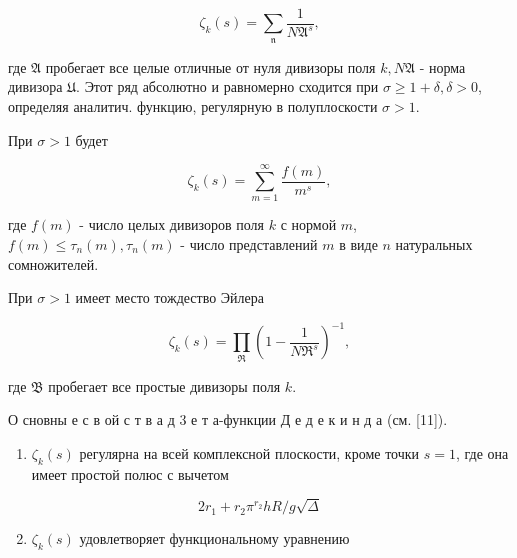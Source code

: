 \documentclass[10pt]{article}
\begin{document}
\[

\zeta_{k}(s)=\sum_{\mathfrak{n}} \frac{1}{N \mathfrak{A}^{s}},

\]



где $\mathfrak{A}$ пробегает все целые отличные от нуля дивизоры поля $k, N \mathfrak{A}$ - норма дивизора $\mathfrak{U}$. Этот ряд абсолютно и равномерно сходится при $\sigma \geqslant 1+\delta, \delta>0$, определяя аналитич. функцию, регулярную в полуплоскости $\sigma>1$.



При $\sigma>1$ будет



\[

\zeta_{k}(s)=\sum_{m=1}^{\infty} \frac{f(m)}{m^{s}},

\]



где $f(m)$ - число целых дивизоров поля $k$ с нормой $m$, $f(m) \leqslant \tau_{n}(m), \tau_{n}(m)$ - число представлений $m$ в виде $n$ натуральных сомножителей.



При $\sigma>1$ имеет место тождество Эйлера



\[

\zeta_{k}(s)=\prod_{\Re}\left(1-\frac{1}{N \Re^{s}}\right)^{-1},

\]



где $\mathfrak{B}$ пробегает все простые дивизоры поля $k$.



О сновны е с в ой с т в а д 3 е т а-функции Д е д е к и н д а (см. [11]).



\begin{enumerate}

  \item $\zeta_{k}(s)$ регулярна на всей комплексной плоскости, кроме точки $s=1$, где она имеет простой полюс с вычетом

\end{enumerate}



\[

2 r_{1}+r_{2} \pi^{r_{2}} h R / g \sqrt{\Delta}

\]



\begin{enumerate}

  \setcounter{enumi}{1}

  \item $\zeta_{k}(s)$ удовлетворяет функциональному уравнению

\end{enumerate}
\end{document}

